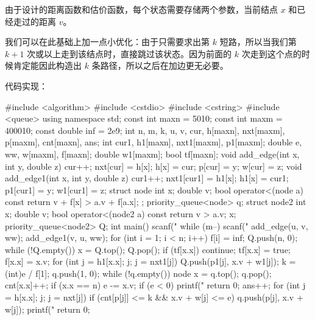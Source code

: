 由于设计的距离函数和估价函数，每个状态需要存储两个参数，当前结点 $x$ 和已经走过的距离 $v$。

我们可以在此基础上加一点小优化：由于只需要求出第 $k$ 短路，所以当我们第 $k+1$ 次或以上走到该结点时，直接跳过该状态。因为前面的 $k$ 次走到这个点的时候肯定能因此构造出 $k$ 条路径，所以之后在加边更无必要。

代码实现：

\begin{cppcode}
#include <algorithm>
#include <cstdio>
#include <cstring>
#include <queue>
using namespace std;
const int maxn = 5010;
const int maxm = 400010;
const double inf = 2e9;
int n, m, k, u, v, cur, h[maxn], nxt[maxm], p[maxm], cnt[maxn], ans;
int cur1, h1[maxn], nxt1[maxm], p1[maxm];
double e, ww, w[maxm], f[maxn];
double w1[maxm];
bool tf[maxn];
void add_edge(int x, int y, double z) {
  cur++;
  nxt[cur] = h[x];
  h[x] = cur;
  p[cur] = y;
  w[cur] = z;
}
void add_edge1(int x, int y, double z) {
  cur1++;
  nxt1[cur1] = h1[x];
  h1[x] = cur1;
  p1[cur1] = y;
  w1[cur1] = z;
}
struct node {
  int x;
  double v;
  bool operator<(node a) const { return v + f[x] > a.v + f[a.x]; }
};
priority_queue<node> q;
struct node2 {
  int x;
  double v;
  bool operator<(node2 a) const { return v > a.v; }
} x;
priority_queue<node2> Q;
int main() {
  scanf("%
  while (m--) {
    scanf("%
    add_edge(u, v, ww);
    add_edge1(v, u, ww);
  }
  for (int i = 1; i < n; i++) f[i] = inf;
  Q.push({n, 0});
  while (!Q.empty()) {
    x = Q.top();
    Q.pop();
    if (tf[x.x]) continue;
    tf[x.x] = true;
    f[x.x] = x.v;
    for (int j = h1[x.x]; j; j = nxt1[j]) Q.push({p1[j], x.v + w1[j]});
  }
  k = (int)e / f[1];
  q.push({1, 0});
  while (!q.empty()) {
    node x = q.top();
    q.pop();
    cnt[x.x]++;
    if (x.x == n) {
      e -= x.v;
      if (e < 0) {
        printf("%
        return 0;
      }
      ans++;
    }
    for (int j = h[x.x]; j; j = nxt[j])
      if (cnt[p[j]] <= k && x.v + w[j] <= e) q.push({p[j], x.v + w[j]});
  }
  printf("%
  return 0;
}
\end{cppcode}
